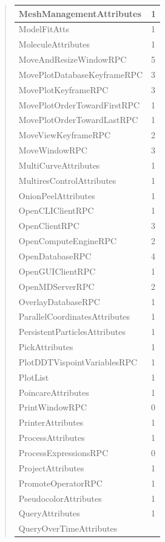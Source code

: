 \documentclass[letterpaper,10pt,english]{sphinxmanual}
\begin{document}
\begin{quote}
\begin{longtable}{|l|l|}
\hline
MeshManagementAttributes
 & 
1
\\
\hline
ModelFitAtts
 & 
1
\\
\hline
MoleculeAttributes
 & 
1
\\
\hline
MoveAndResizeWindowRPC
 & 
5
\\
\hline
MovePlotDatabaseKeyframeRPC
 & 
3
\\
\hline
MovePlotKeyframeRPC
 & 
3
\\
\hline
MovePlotOrderTowardFirstRPC
 & 
1
\\
\hline
MovePlotOrderTowardLastRPC
 & 
1
\\
\hline
MoveViewKeyframeRPC
 & 
2
\\
\hline
MoveWindowRPC
 & 
3
\\
\hline
MultiCurveAttributes
 & 
1
\\
\hline
MultiresControlAttributes
 & 
1
\\
\hline
OnionPeelAttributes
 & 
1
\\
\hline
OpenCLIClientRPC
 & 
1
\\
\hline
OpenClientRPC
 & 
3
\\
\hline
OpenComputeEngineRPC
 & 
2
\\
\hline
OpenDatabaseRPC
 & 
4
\\
\hline
OpenGUIClientRPC
 & 
1
\\
\hline
OpenMDServerRPC
 & 
2
\\
\hline
OverlayDatabaseRPC
 & 
1
\\
\hline
ParallelCoordinatesAttributes
 & 
1
\\
\hline
PersistentParticlesAttributes
 & 
1
\\
\hline
PickAttributes
 & 
1
\\
\hline
PlotDDTVispointVariablesRPC
 & 
1
\\
\hline
PlotList
 & 
1
\\
\hline
PoincareAttributes
 & 
1
\\
\hline
PrintWindowRPC
 & 
0
\\
\hline
PrinterAttributes
 & 
1
\\
\hline
ProcessAttributes
 & 
1
\\
\hline
ProcessExpressionsRPC
 & 
0
\\
\hline
ProjectAttributes
 & 
1
\\
\hline
PromoteOperatorRPC
 & 
1
\\
\hline
PseudocolorAttributes
 & 
1
\\
\hline
QueryAttributes
 & 
1
\\
\hline
QueryOverTimeAttributes

\end{longtable}
\end{quote}
\end{document}
